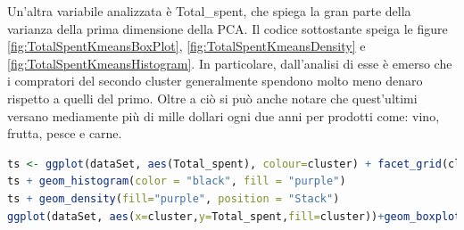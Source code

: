 \documentclass[letterpaper,11pt]{article}
\begin{document}
Un'altra variabile analizzata è Total\_spent, che spiega la gran parte della varianza della prima dimensione della PCA. Il codice sottostante speiga le figure \ref{fig:TotalSpentKmeansBoxPlot}, \ref{fig:TotalSpentKmeansDensity} e \ref{fig:TotalSpentKmeansHistogram}. In particolare, dall'analisi di esse è emerso che i compratori del secondo cluster generalmente spendono molto meno denaro rispetto a quelli del primo. Oltre a ciò si può anche notare che quest'ultimi versano mediamente più di mille dollari ogni due anni per prodotti come: vino, frutta, pesce e carne.
\begin{lstlisting}[language=R]
ts <- ggplot(dataSet, aes(Total_spent), colour=cluster) + facet_grid(cluster~.)
ts + geom_histogram(color = "black", fill = "purple") 
ts + geom_density(fill="purple", position = "Stack")
ggplot(dataSet, aes(x=cluster,y=Total_spent,fill=cluster))+geom_boxplot(outlier.colour="black")
\end{lstlisting}
\end{document}
